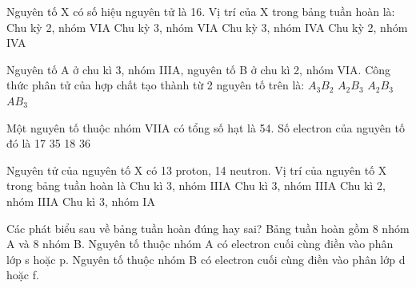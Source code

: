 \begin{ex}[1 điểm]
Nguyên tố X có số hiệu nguyên tử là 16. Vị trí của X trong bảng tuần hoàn là:
    \choice
    {Chu kỳ 2, nhóm VIA}
    {\True Chu kỳ 3, nhóm VIA}
    {Chu kỳ 3, nhóm IVA}
    {Chu kỳ 2, nhóm IVA}
\end{ex}

\begin{ex}[1 điểm]
Nguyên tố A ở chu kì 3, nhóm IIIA, nguyên tố B ở chu kì 2, nhóm VIA. Công thức phân tử của hợp chất tạo thành từ 2 nguyên tố trên là:
    \choice
    {$A_3B_2$}
    {$A_2B_3$}
    {\True $A_2B_3$}
    {$AB_3$}
\end{ex}

\begin{ex}[1 điểm]
Một nguyên tố thuộc nhóm VIIA có tổng số hạt là 54.  Số electron của nguyên tố đó là
    \choice
    {17}
    {35}
    {18}
    {36}
\end{ex}

\begin{ex}[1 điểm]
Nguyên tử của nguyên tố X có 13 proton, 14 neutron. Vị trí của nguyên tố X trong bảng tuần hoàn là
    \choice
    {Chu kì 3, nhóm IIIA}
    {\True Chu kì 3, nhóm IIIA}
    {Chu kì 2, nhóm IIIA}
    {Chu kì 3, nhóm IA}
\end{ex}



\begin{ex}[1 điểm]
	Các phát biểu sau về bảng tuần hoàn đúng hay sai?
	{\True Bảng tuần hoàn gồm 8 nhóm A và 8 nhóm B.}
	{Nguyên tố thuộc nhóm A có electron cuối cùng điền vào phân lớp s hoặc p.}
	{\True Nguyên tố thuộc nhóm B có electron cuối cùng điền vào phân lớp d hoặc f.}
\end{ex}


